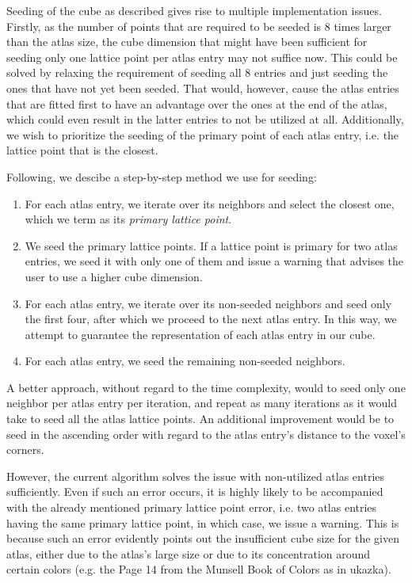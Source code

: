 Seeding of the cube as described gives rise to multiple implementation issues. Firstly, as the number of points that are required to be seeded is 8 times larger than the atlas size, the cube dimension that might have been sufficient for seeding only one lattice point per atlas entry may not suffice now. This could be solved by relaxing the requirement of seeding all 8 entries and just seeding the ones that have not yet been seeded. That would, however, cause the atlas entries that are fitted first to have an advantage over the ones at the end of the atlas, which could even result in the latter entries to not be utilized at all. Additionally, we wish to prioritize the seeding of the primary point of each atlas entry, i.e. the lattice point that is the closest. 

Following, we descibe a step-by-step method we use for seeding:
\begin{enumerate}
	\item For each atlas entry, we iterate over its neighbors and select the closest one, which we term as its \emph{primary lattice point}.
	\item We seed the primary lattice points. If a lattice point is primary for two atlas entries, we seed it with only one of them and issue a warning that advises the user to use a higher cube dimension.
	\item For each atlas entry, we iterate over its non-seeded neighbors and seed only the first four, after which we proceed to the next atlas entry. In this way, we attempt to guarantee the representation of each atlas entry in our cube.
	\item For each atlas entry, we seed the remaining non-seeded neighbors.
\end{enumerate}

A better approach, without regard to the time complexity, would to seed only one neighbor per atlas entry per iteration, and repeat as many iterations as it would take to seed all the atlas lattice points. An additional improvement would be to seed in the ascending order with regard to the atlas entry's distance to the voxel's corners.

However, the current algorithm solves the issue with non-utilized atlas entries sufficiently. Even if such an error occurs, it is highly likely to be accompanied with the already mentioned primary lattice point error, i.e. two atlas entries having the same primary lattice point, in which case, we issue a warning. This is because such an error evidently points out the insufficient cube size for the given atlas, either due to the atlas's large size or due to its concentration around certain colors (e.g. the Page 14 from the Munsell Book of Colors as in ukazka).

